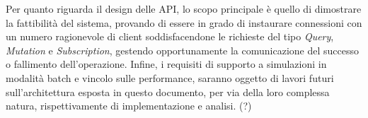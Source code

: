 
Per quanto riguarda il design delle \ac{API}, lo scopo principale è quello di dimostrare la fattibilità del sistema, provando di essere in grado
di instaurare connessioni con un numero ragionevole di client soddisfacendone le richieste del tipo \textit{Query}, \textit{Mutation} e \textit{Subscription},
gestendo opportunamente la comunicazione del successo o fallimento dell'operazione.
Infine, i requisiti di supporto a simulazioni in modalità batch e vincolo sulle performance, saranno oggetto di lavori futuri sull'architettura
esposta in questo documento, per via della loro complessa natura, rispettivamente di implementazione e analisi. (?)

